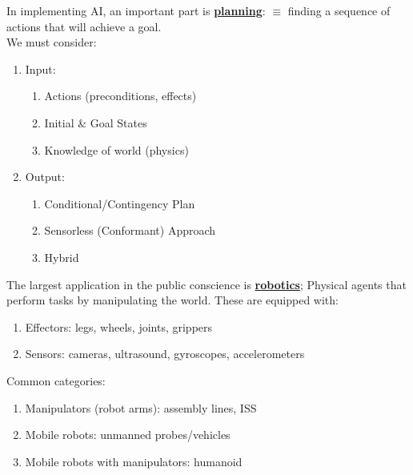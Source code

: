 \documentclass[../../lecture_notes.tex]{subfiles}
\begin{document}
\noindent In implementing AI, an important part is \textbf{\underline{planning}}:
	$\equiv$ finding a sequence of actions that will achieve a goal.\\
	\indent We must consider:
	\begin{enumerate} [itemsep=0mm]
		\item Input:
			\begin{enumerate} [itemsep=0mm]
				\item Actions (preconditions, effects)
				\item Initial \& Goal States
				\item Knowledge of world (physics)
			\end{enumerate}
		\item Output:
			\begin{enumerate} [itemsep=0mm]
				\item Conditional/Contingency Plan
				\item Sensorless (Conformant) Approach
				\item Hybrid
			\end{enumerate}
	\end{enumerate} \medskip

\noindent The largest application in the public conscience is \textbf{\underline{robotics}};
	\indent Physical agents that perform tasks by manipulating the world.
	\indent \indent These are equipped with:
		\begin{enumerate} [itemsep=0mm]
			\item Effectors: legs, wheels, joints, grippers
			\item Sensors: cameras, ultrasound, gyroscopes, accelerometers
		\end{enumerate}
    \indent \indent Common categories:
	    \begin{enumerate} [itemsep=0mm]
		\item Manipulators (robot arms): assembly lines, ISS
		\item Mobile robots: unmanned probes/vehicles
		\item Mobile robots with manipulators: humanoid
	\end{enumerate}
\end{document}
